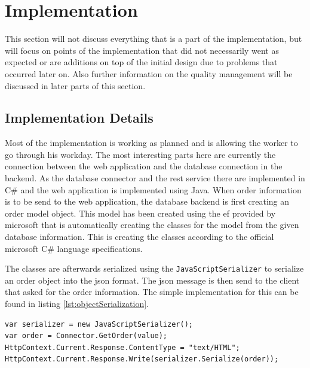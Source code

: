 \section{Implementation}
This section will not discuss everything that is a part of the implementation, but will focus on points of the implementation that did not necessarily went as expected or are additions on top of the initial design due to problems that occurred later on. Also further information on the quality management will be discussed in later parts of this section.

\subsection{Implementation Details}
Most of the implementation is working as planned and is allowing the worker to go through his workday. The most interesting parts here are currently the connection between the web application and the database connection in the backend. As the database connector and the rest service there are implemented in C\# and the web application is implemented using Java. When order information is to be send to the web application, the database backend is first creating an order model object. This model has been created using the \gls{ef} provided by microsoft that is automatically creating the classes for the model from the given database information. This is creating the classes according to the official microsoft C\# language specifications. \citep{manual:csSpecification} 

The classes are afterwards serialized using the \texttt{JavaScriptSerializer} to \gls{serialize} an order object into the \gls{json} format. The \gls{json} message is then send to the client that asked for the order information. The simple implementation for this can be found in listing \ref{lst:objectSerialization}.

\clearpage

\lstset{language=[Sharp]C}
\begin{lstlisting}[frame=single, caption=C\# Object Serialization, label=lst:objectSerialization]
var serializer = new JavaScriptSerializer();
var order = Connector.GetOrder(value);
HttpContext.Current.Response.ContentType = "text/HTML";
HttpContext.Current.Response.Write(serializer.Serialize(order));
\end{lstlisting}

